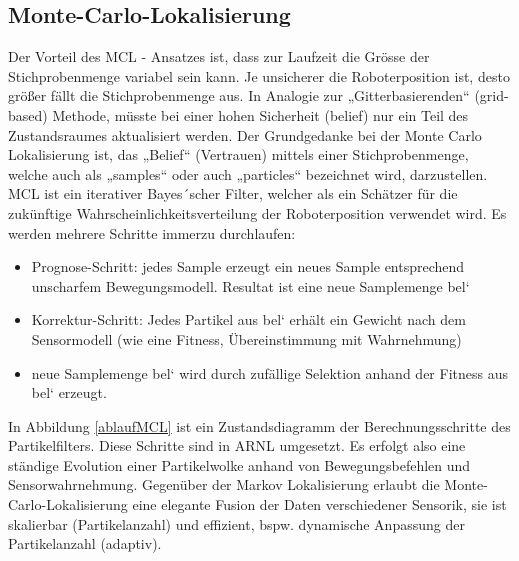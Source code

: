 \documentclass{article}
\begin{document}
\subsection{Monte-Carlo-Lokalisierung}
Der Vorteil des MCL - Ansatzes ist, dass zur Laufzeit die Gr\"osse der
Stichprobenmenge variabel sein kann. Je unsicherer die Roboterposition ist,
desto gr\"oßer f\"allt die Stichprobenmenge aus. In Analogie zur
„Gitterbasierenden“ (grid-based) Methode, m\"usste bei einer hohen Sicherheit
(belief) nur ein Teil des Zustandsraumes aktualisiert werden.\cite{delipetkos1}
Der Grundgedanke bei der Monte Carlo Lokalisierung ist, das „Belief“
(Vertrauen) mittels einer Stichprobenmenge, welche auch als „samples“ oder
auch „particles“ bezeichnet wird, darzustellen. MCL ist ein iterativer Bayes´scher
Filter, welcher als ein Sch\"atzer f\"ur die zuk\"unftige Wahrscheinlichkeitsverteilung
der Roboterposition verwendet wird.
Es werden mehrere Schritte immerzu durchlaufen:
\begin{itemize}
	\item 	Prognose-Schritt: jedes Sample erzeugt ein neues Sample entsprechend
	unscharfem Bewegungsmodell. Resultat ist eine neue Samplemenge bel` 
	\item Korrektur-Schritt:  Jedes Partikel aus bel` erh\"alt ein Gewicht nach dem Sensormodell (wie eine 	Fitness, Übereinstimmung mit Wahrnehmung)
	\item  neue Samplemenge bel` wird durch zuf\"allige Selektion anhand der Fitness aus
	bel‘ erzeugt.
\end{itemize}
In Abbildung \ref{ablaufMCL} ist ein Zustandsdiagramm der Berechnungsschritte des Partikelfilters. Diese Schritte sind in ARNL umgesetzt.
Es erfolgt also eine st\"andige Evolution einer Partikelwolke anhand von Bewegungsbefehlen und
Sensorwahrnehmung.
Gegen\"uber der Markov Lokalisierung erlaubt die Monte-Carlo-Lokalisierung eine elegante Fusion der Daten verschiedener Sensorik, sie ist skalierbar (Partikelanzahl) und effizient, bspw. dynamische Anpassung der Partikelanzahl (adaptiv).
\end{document}
